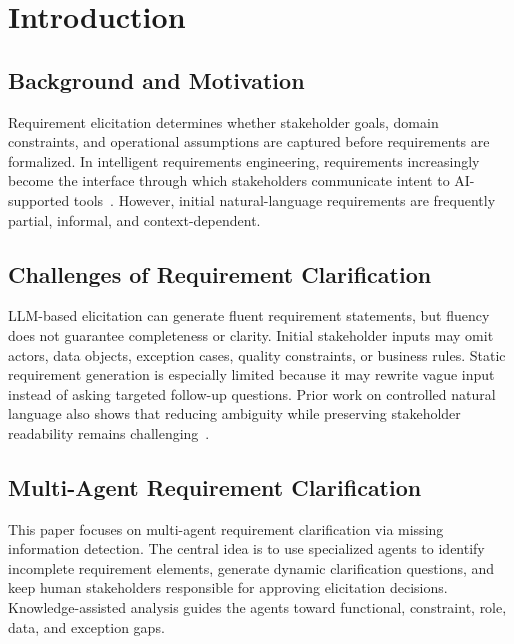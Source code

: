 \section{Introduction}
\label{introduction}

\subsection{Background and Motivation}
Requirement elicitation determines whether stakeholder goals, domain constraints, and operational assumptions are captured before requirements are formalized.
In intelligent requirements engineering, requirements increasingly become the interface through which stakeholders communicate intent to AI-supported tools~\cite{robinsonRequirementsAreAll2025}.
However, initial natural-language requirements are frequently partial, informal, and context-dependent.

\subsection{Challenges of Requirement Clarification}
LLM-based elicitation can generate fluent requirement statements, but fluency does not guarantee completeness or clarity.
Initial stakeholder inputs may omit actors, data objects, exception cases, quality constraints, or business rules.
Static requirement generation is especially limited because it may rewrite vague input instead of asking targeted follow-up questions.
Prior work on controlled natural language also shows that reducing ambiguity while preserving stakeholder readability remains challenging~\cite{darifControlledNaturalLanguage2026}.

\subsection{Multi-Agent Requirement Clarification}
This paper focuses on multi-agent requirement clarification via missing information detection.
The central idea is to use specialized agents to identify incomplete requirement elements, generate dynamic clarification questions, and keep human stakeholders responsible for approving elicitation decisions.
Knowledge-assisted analysis guides the agents toward functional, constraint, role, data, and exception gaps.

